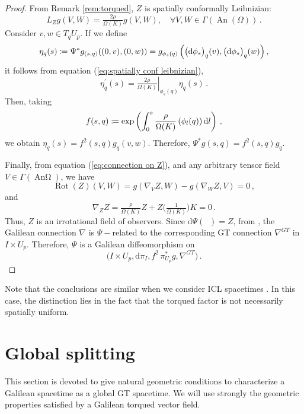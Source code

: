 \documentclass[12pt]{article}
\newcommand{\diff}{\mathrm{d}}
\newcommand{\coloneq}{\vcentcolon\mathrel{\mkern -1.2mu}\mathrel{=}}
\DeclareMathOperator{\pt}{\partial_t}
\DeclareMathOperator{\An}{\text{An}\Omega}
\begin{document}
\begin{proof}
    From Remark \ref{rem:torqued}, $Z$ is spatially conformally Leibnizian:
    \begin{equation}\label{eq:spatially conf leibnizian}
        L_Z g(V, W)=\tfrac{2 \rho}{\Omega(K)} g(V, W), \quad \forall V, W \in \Gamma(\operatorname{An}(\Omega)) \,.
    \end{equation}
    Consider $v,w\in T_q U_p$. If we define
    $$
    \eta_q(s)\coloneq \Psi^* g_{(s, q)}((0, v),(0, w))=g_{\phi_s(q)}\left(\big(\diff \phi_s\big)_q(v), \big(\diff \phi_s\big)_q(w)\right),
    $$
    it follows from equation (\ref{eq:spatially conf leibnizian}),
    $$
    \eta_q^{\prime}(s)=\left.\tfrac{2 \rho}{\Omega(K)}\right|_{\phi_s(q)} \eta_q(s)\,.
    $$
    Then, taking
    \begin{equation}\label{eq:scale factor}
        f(s,q)\coloneq\exp \left(\int_0^s \frac{\rho}{\Omega(K)}\left(\phi_l(q)\right) \diff l\right)\,,
    \end{equation}
    we obtain $\eta_q(s)=f^2(s,q) g_q(v,w)$. Therefore, $\Psi^* g(s,q)=f^2(s,q) g_q$.
    
    Finally, from equation (\ref{eq:connection on Z}), and any arbitrary tensor field $V\in \Gamma(\An)$, we have
    $$
    \operatorname{Rot}(Z)(V, W)=g\left(\nabla_V Z, W\right)-g\left(\nabla_W Z, V\right) =0\,,
    $$
    and 
    \begin{equation*}
        \nabla_Z Z = \tfrac{\rho}{\Omega(K)} Z + Z\big(\tfrac{1}{\Omega(K)}\big) K = 0\,.
    \end{equation*}
    Thus, $Z$ is an irrotational field of observers. Since $\diff\Psi(\pt) = Z$, from \cite[Cor. 28]{Bernal}, the Galilean connection $\nabla$ is $\Psi-$related to the corresponding GT connection $\nabla^{GT}$ in $I\times U_p$. Therefore, $\Psi$ is a Galilean diffeomorphism on 
    \begin{equation*}
        \big(I\times U_p, \diff \pi_I, f^2\, \pi_{U_p}^* g, \nabla^{GT}\big)\,.
    \end{equation*}
\end{proof}

Note that the conclusions are similar when we consider ICL spacetimes \cite{GGRW}. In this case, the distinction lies in the fact that the torqued factor is not necessarily spatially uniform.

\section{Global splitting}\label{sect6}
This section is devoted to give natural geometric conditions to characterize a Galilean spacetime as a global GT spacetime. We will use strongly the geometric properties satisfied by a Galilean torqued vector field.
\end{document}
